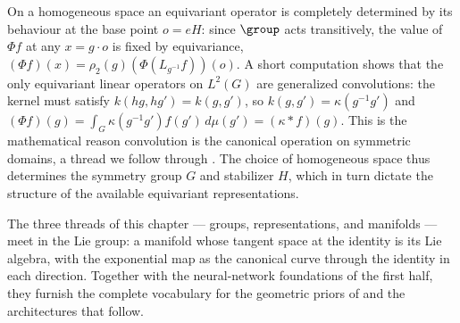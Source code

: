 On a homogeneous space an equivariant operator is completely determined by its
behaviour at the base point $o = eH$: since $\group$ acts transitively, the value
of $\Phi f$ at any $x = g\cdot o$ is fixed by equivariance,
$(\Phi f)(x) = \rho_2(g)(\Phi(L_{g^{-1}}f))(o)$. A short computation shows that
the only equivariant linear operators on $L^2(G)$ are generalized convolutions:
the kernel must satisfy $k(hg, hg') = k(g, g')$, so $k(g,g') = \kappa(g^{-1}g')$
and $(\Phi f)(g) = \int_G \kappa(g^{-1}g')f(g')\,d\mu(g') = (\kappa * f)(g)$. This
is the mathematical reason convolution is the canonical operation on symmetric
domains, a thread we follow through . The
choice of homogeneous space thus determines the symmetry group $G$ and stabilizer
$H$, which in turn dictate the structure of the available equivariant
representations.

\medskip

The three threads of this chapter --- groups, representations, and manifolds ---
meet in the Lie group: a manifold whose tangent space at the identity is its Lie
algebra, with the exponential map as the canonical curve through the identity in
each direction. Together with the neural-network foundations of the first half,
they furnish the complete vocabulary for the geometric priors of 
and the architectures that follow.
